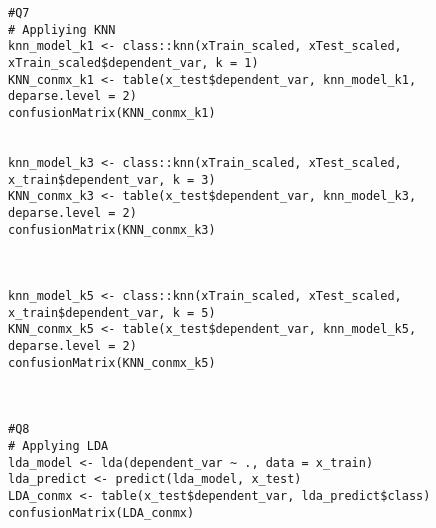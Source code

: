 \documentclass{article}
\begin{document}
\begin{verbatim}
#Q7
# Appliying KNN
knn_model_k1 <- class::knn(xTrain_scaled, xTest_scaled, xTrain_scaled$dependent_var, k = 1)
KNN_conmx_k1 <- table(x_test$dependent_var, knn_model_k1, deparse.level = 2)
confusionMatrix(KNN_conmx_k1)


knn_model_k3 <- class::knn(xTrain_scaled, xTest_scaled, x_train$dependent_var, k = 3)
KNN_conmx_k3 <- table(x_test$dependent_var, knn_model_k3, deparse.level = 2)
confusionMatrix(KNN_conmx_k3)



knn_model_k5 <- class::knn(xTrain_scaled, xTest_scaled, x_train$dependent_var, k = 5)
KNN_conmx_k5 <- table(x_test$dependent_var, knn_model_k5, deparse.level = 2)
confusionMatrix(KNN_conmx_k5)



#Q8
# Applying LDA
lda_model <- lda(dependent_var ~ ., data = x_train)
lda_predict <- predict(lda_model, x_test)
LDA_conmx <- table(x_test$dependent_var, lda_predict$class)
confusionMatrix(LDA_conmx)
\end{verbatim}
\end{document}
